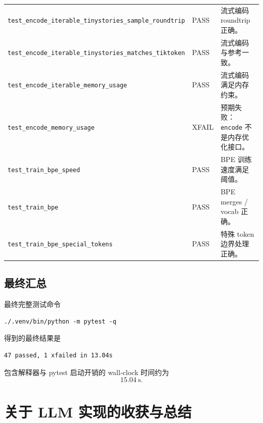 \documentclass[UTF8,a4paper,11pt]{ctexart}
\begin{document}
\begin{longtable}{p{} p{} p{}}
\texttt{test\_encode\_iterable\_tinystories\_sample\_roundtrip} & PASS & 流式编码 roundtrip 正确。 \\
\texttt{test\_encode\_iterable\_tinystories\_matches\_tiktoken} & PASS & 流式编码与参考一致。 \\
\texttt{test\_encode\_iterable\_memory\_usage} & PASS & 流式编码满足内存约束。 \\
\texttt{test\_encode\_memory\_usage} & XFAIL & 预期失败：\texttt{encode} 不是内存优化接口。 \\
\texttt{test\_train\_bpe\_speed} & PASS & BPE 训练速度满足阈值。 \\
\texttt{test\_train\_bpe} & PASS & BPE merges / vocab 正确。 \\
\texttt{test\_train\_bpe\_special\_tokens} & PASS & 特殊 token 边界处理正确。 \\
\bottomrule
\end{longtable}
\normalsize

\subsection{最终汇总}
最终完整测试命令
\begin{lstlisting}
./.venv/bin/python -m pytest -q
\end{lstlisting}
得到的最终结果是
\begin{lstlisting}
47 passed, 1 xfailed in 13.04s
\end{lstlisting}
包含解释器与 pytest 启动开销的 wall-clock 时间约为
\[
15.04\ \text{s}.
\]

\newpage
\section{关于 LLM 实现的收获与总结}
\end{document}
